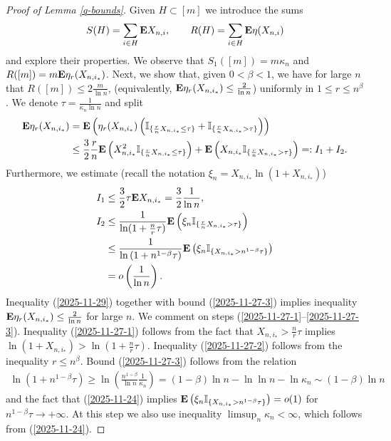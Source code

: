 \documentclass[11pt, a4paper]{article}
\newcommand{\E}{{\bf{E}}}
\begin{document}
\begin{proof}[Proof of Lemma \ref{q-bounds}]
Given $H\subset [m]$ we introduce the sums 
\begin{align*}
S(H)=\sum_{i\in H}\E X_{n,i},
\qquad
R(H)
=
\sum_{i\in H}
\E
\eta(X_{n,i})
\end{align*}
and explore their properties. 
We observe that   
 $S_1([m])=m\kappa_n$ and $R([m])
=
m\E
\eta_r(X_{n,i_*})$. 
%
Next, we show that, given $0<\beta<1$, 
we have 
for large $n$ that 
$R([m])\le 2\frac{m}{\ln n}$, 
(equivalently,
$\E
\eta_r(X_{n,i_*})
\le 
\frac{2}{\ln n}$) uniformly in $1\le r\le n^{\beta}$.
We denote 
 $\tau=\frac{1}{\kappa_n\ln n}$ and split
\begin{align*}
\E \eta_r(X_{n,i_*})
&
=
\E 
\left(
\eta_r(X_{n,i_*})
\left(
{\mathbb I}_{\{\frac{r}{n}X_{n,i_*}\le \tau\}}
+
{\mathbb I}_{\{\frac{r}{n}X_{n,i_*}> \tau\}}
\right)
\right)
\\
&
\le 
\frac{3}{2}\frac{r}{n}\E \left(X_{n,i_*}^2
{\mathbb I}_{\{\frac{r}{n}X_{n,i_*}\le \tau\}}
\right)
+
\E \left(
X_{n,i_*}
{\mathbb I}_{\{\frac{r}{n}X_{n,i_*}> \tau\}}
\right)
=:I_1+I_2.
\end{align*}
Furthermore, we  estimate (recall the notation $\xi_n=X_{n,i_*}\ln(1+X_{n,i_*})$)
\begin{align}
\label{2025-11-29}
I_1
&
\le 
\frac{3}{2}
\tau \E X_{n,i_*}
=
\frac{3}{2}\frac{1}{\ln n},
\\
\label{2025-11-27-1}
I_2
&
\le
\frac{1}{\ln(1+\frac{n}{r}\tau)}
\E \left(
\xi_n
{\mathbb I}_{\{\frac{r}{n}X_{n,i_*}> \tau\}}
\right)
\\
\label{2025-11-27-2}
&
\le 
\frac{1}
{
\ln
\left(
1
+
n^{1-\beta}\tau
\right)
}
\E \left(
\xi_n
{\mathbb I}_{\{X_{n,i_*}> n^{1-\beta}\tau\}}
\right)
\\
\label{2025-11-27-3}
&
=
o\left(\frac{1}{\ln n}\right).
\end{align}
Inequality (\ref{2025-11-29}) together with bound (\ref{2025-11-27-3}) implies inequality $\E
\eta_r(X_{n,i_*})
\le 
\frac{2}{\ln n}$ for large $n$.
We comment on
steps (\ref{2025-11-27-1}--\ref{2025-11-27-3}). 
Inequality (\ref{2025-11-27-1}) follows from the fact 
that $X_{n,i_*}>\frac{n}{r}\tau$ 
implies $\ln (1+X_{n,i_*})>\ln (1+\frac{n}{r}\tau)$.
Inequality (\ref{2025-11-27-2}) follows from the 
inequality $r\le n^{\beta}$. Bound (\ref{2025-11-27-3})
follows from the  relation 
\begin{align*}
\ln
\left(
1
+
n^{1-\beta}\tau
\right)
\ge 
\ln
\left(
\frac{n^{1-\beta}}{\ln n}
\frac {1}{\kappa_n}
\right)
=
 (1-\beta)\ln n-\ln\ln n-\ln \kappa_n
 \sim 
 (1-\beta)\ln n
 \end{align*}
   and the fact that 
(\ref{2025-11-24})  implies $\E \left(
\xi_n
{\mathbb I}_{\{X_{n,i_*}> n^{1-\beta}\tau\}}
\right)=o(1)$ for $n^{1-\beta}\tau\to+\infty$.
At this step we also  use inequality
$\limsup_n\kappa_n<\infty$,  which 
follows from  (\ref{2025-11-24}).
 


\end{proof}
\end{document}
